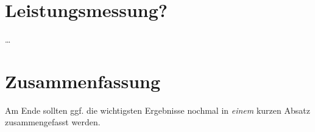 \section{Leistungsmessung?}
\label{ch:Evaluierung:sec:Abschnitt2}

\ldots

\section{Zusammenfassung}
\label{ch:Evaluierung:sec:zusammenfassung}

Am Ende sollten ggf. die wichtigsten Ergebnisse nochmal in \emph{einem} kurzen Absatz zusammengefasst werden.

